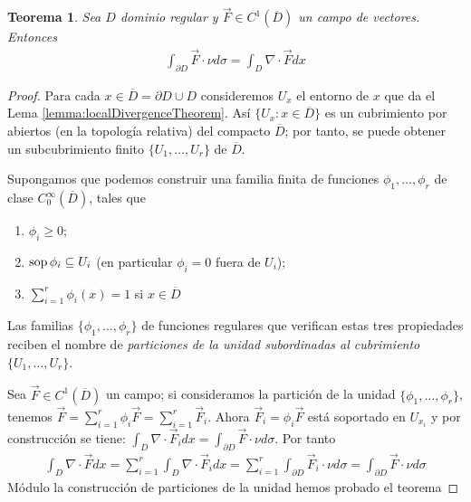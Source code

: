 \documentclass{report}
\newtheorem{theorem}{Teorema}
\theoremstyle{remark}
\DeclareMathOperator{\support}{\textnormal{sop}}
\begin{document}
  \begin{theorem}
    Sea \(D\) dominio regular y \(\vec{F} \in C^1\left(\overline{D}\right)\) un campo de vectores.
    Entonces
    \begin{align}
      \int_{\partial D} \vec{F} \cdot \nu d \sigma
      =
      \int_D \nabla \cdot \vec{F} dx
    \end{align}
  \end{theorem}
  \begin{proof}
    Para cada \(x \in \overline{D} = \partial D \cup D\) consideremos \(U_x\) el entorno de \(x\) que da el Lema \ref{lemma:localDivergenceTheorem}.
    Así \(\{U_x : x \in \overline{D}\}\) es un cubrimiento por abiertos (en la topología relativa) del compacto \(\overline{D}\);
    por tanto, se puede obtener un subcubrimiento finito \(\{U_1, \dots, U_r\}\) de \(\overline{D}\).

    Supongamos que podemos construir una familia finita de funciones \(\phi_1, \dots, \phi_r\) de clase \(C^{\infty}_0(\overline{D})\), tales que
    \begin{enumerate}
      \item \(\phi_i \geq 0\);
      \item \(\support \phi_i \subseteq U_i\) (en particular \(\phi_i = 0\) fuera de \(U_i\));
      \item \(\sum_{i = 1}^r \phi_i(x) = 1\) si \(x \in \overline{D}\)
    \end{enumerate}
    Las familias \(\{\phi_1, \dots, \phi_r\}\) de funciones regulares que verifican estas tres propiedades reciben el nombre de \emph{particiones de la unidad subordinadas al cubrimiento} \(\{U_1, \dots, U_r\}\).

    Sea \(\vec{F} \in C^1(\overline{D})\) un campo;
    si consideramos la partición de la unidad \(\{\phi_1, \dots, \phi_r\}\), tenemos
    \(
      \vec{F}
      =
      \sum_{i = 1}^r \phi_i \vec{F}
      =
      \sum_{i = 1}^r \vec{F}_i
    \).
    Ahora \(\vec{F}_i = \phi_i \vec{F}\) está soportado en \(U_{x_i}\) y por construcción se tiene:
    \(
      \int_D \nabla \cdot \vec{F}_i dx
      =
      \int_{\partial D} \vec{F} \cdot \nu d \sigma
    \).
    Por tanto
    \begin{align}
      \int_D \nabla \cdot \vec{F} dx
      =
      \sum_{i = 1}^r \int_D \nabla \cdot \vec{F}_i dx
      =
      \sum_{i = 1}^r \int_{\partial D} \vec{F}_i \cdot \nu d \sigma
      =
      \int_{\partial D} \vec{F} \cdot \nu d \sigma
    \end{align}
    Módulo la construcción de particiones de la unidad hemos probado el teorema
  \end{proof}
\end{document}
